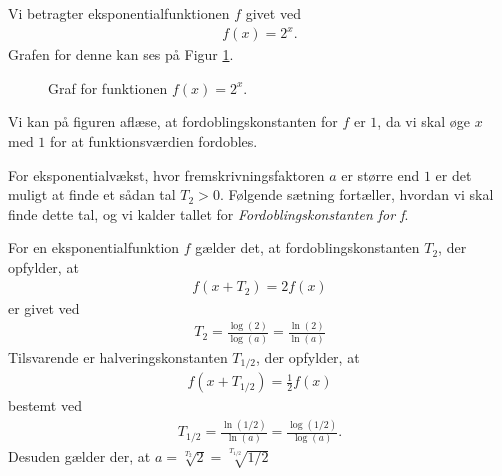 \begin{exa}
	Vi betragter eksponentialfunktionen $f$ givet ved
	\begin{align*}
		f(x) = 2^x.
	\end{align*}
	Grafen for denne kan ses på Figur \ref{fig:eksempel}.
	\begin{figure}[H]
		\centering
		\caption{Graf for funktionen $f(x) = 2^x$.}
		\label{fig:eksempel}
	\end{figure}
	Vi kan på figuren aflæse, at fordoblingskonstanten for $f$ er $1$, da vi skal øge $x$ med $1$ for at funktionsværdien fordobles. 
\end{exa}
For eksponentialvækst, hvor fremskrivningsfaktoren $a$ er større end $1$ er det muligt at finde et sådan tal $T_2>0$. Følgende sætning fortæller, hvordan vi skal finde dette tal, og vi kalder tallet for \textit{Fordoblingskonstanten for f}.
\begin{setn}
For en eksponentialfunktion $f$ gælder det, at fordoblingskonstanten $T_2$, der opfylder, at
\begin{align*}
f(x+T_2) = 2f(x)
\end{align*}
er givet ved 
\begin{align*}
T_2 = \frac{\log(2)}{\log(a)} = \frac{\ln(2)}{\ln(a)}
\end{align*}
Tilsvarende er halveringskonstanten $T_{1/2}$, der opfylder, at 
\begin{align*}
f(x+T_{1/2}) = \frac{1}{2}f(x)
\end{align*}
bestemt ved
\begin{align*}
T_{1/2} = \frac{\ln(1/2)}{\ln(a)} = \frac{\log(1/2)}{\log(a)}.
\end{align*}
Desuden gælder der, at $a = \sqrt[T_2]{2}= \sqrt[T_{1/2}]{1/2}$
\end{setn}
